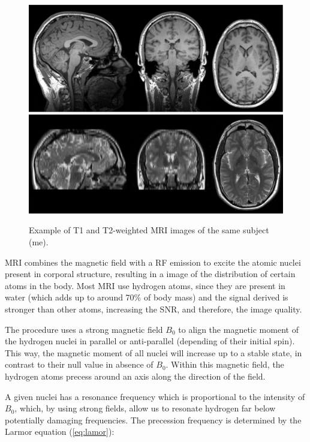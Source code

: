 \begin{figure}[htp]
	\centering
	\includegraphics[width=0.7\linewidth]{Graphics/ch2/example_MRIT1}\\
	\includegraphics[width=0.7\linewidth]{Graphics/ch2/example_MRIT2}
	\caption[Example of T1 and T2-weighted \acs{MRI} images.]{Example of T1 and T2-weighted \ac{MRI} images of the same subject (me).}
	\label{fig:example_MRI}
\end{figure}

\ac{MRI} combines the magnetic field with a \ac{RF} emission to excite the atomic nuclei present in corporal structure, resulting in a image of the distribution of certain atoms in the body. Most \ac{MRI} use hydrogen atoms, since they are present in water (which adds up to around 70\% of body mass) and the signal derived is stronger than other atoms, increasing the \ac{SNR}, and therefore, the image quality. 

The procedure uses a strong magnetic field $B_0$ to align the magnetic moment of the hydrogen nuclei in parallel or anti-parallel (depending of their initial spin). This way, the magnetic moment of all nuclei will increase up to a stable state, in contrast to their null value in absence of $B_0$. Within this magnetic field, the hydrogen atoms precess around an axis along the direction of the field. 

A given nuclei has a resonance frequency which is proportional to the intensity of $B_0$, which, by using strong fields, allow us to resonate hydrogen far below potentially damaging frequencies. The precession frequency is determined by the Larmor equation (\ref{eq:lamor}):

